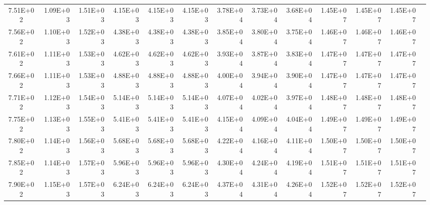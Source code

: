 \documentclass{article}
\begin{document}
\begin{table}
\begin{tabular}{crrr|rrr|rrr|rrr}
7.51E+02   & 1.09E+03   & 1.51E+03   & 4.15E+03   & 4.15E+03   & 4.15E+03   & 3.78E+04   & 3.73E+04   & 3.68E+04   & 1.45E+07   & 1.45E+07   & 1.45E+07   \\
7.56E+02   & 1.10E+03   & 1.52E+03   & 4.38E+03   & 4.38E+03   & 4.38E+03   & 3.85E+04   & 3.80E+04   & 3.75E+04   & 1.46E+07   & 1.46E+07   & 1.46E+07   \\
7.61E+02   & 1.11E+03   & 1.53E+03   & 4.62E+03   & 4.62E+03   & 4.62E+03   & 3.93E+04   & 3.87E+04   & 3.83E+04   & 1.47E+07   & 1.47E+07   & 1.47E+07   \\
7.66E+02   & 1.11E+03   & 1.53E+03   & 4.88E+03   & 4.88E+03   & 4.88E+03   & 4.00E+04   & 3.94E+04   & 3.90E+04   & 1.47E+07   & 1.47E+07   & 1.47E+07   \\
7.71E+02   & 1.12E+03   & 1.54E+03   & 5.14E+03   & 5.14E+03   & 5.14E+03   & 4.07E+04   & 4.02E+04   & 3.97E+04   & 1.48E+07   & 1.48E+07   & 1.48E+07   \\
7.75E+02   & 1.13E+03   & 1.55E+03   & 5.41E+03   & 5.41E+03   & 5.41E+03   & 4.15E+04   & 4.09E+04   & 4.04E+04   & 1.49E+07   & 1.49E+07   & 1.49E+07   \\
7.80E+02   & 1.14E+03   & 1.56E+03   & 5.68E+03   & 5.68E+03   & 5.68E+03   & 4.22E+04   & 4.16E+04   & 4.11E+04   & 1.50E+07   & 1.50E+07   & 1.50E+07   \\
7.85E+02   & 1.14E+03   & 1.57E+03   & 5.96E+03   & 5.96E+03   & 5.96E+03   & 4.30E+04   & 4.24E+04   & 4.19E+04   & 1.51E+07   & 1.51E+07   & 1.51E+07   \\
7.90E+02   & 1.15E+03   & 1.57E+03   & 6.24E+03   & 6.24E+03   & 6.24E+03   & 4.37E+04   & 4.31E+04   & 4.26E+04   & 1.52E+07   & 1.52E+07   & 1.52E+07  
\end{tabular}   \end{table}
\end{document}
